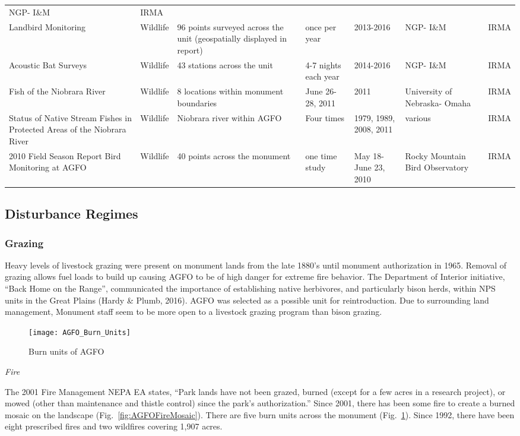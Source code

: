 \begin{longtable}[l]{@{}p{5cm}p{2cm}p{3cm}p{4cm}p{3cm}p{4cm}p{3cm}@{}}
NGP- I\&M & IRMA\tabularnewline
Landbird Monitoring & Wildlife & 96 points surveyed across the unit
(geospatially displayed in report) & once per year & 2013-2016 & NGP-
I\&M & IRMA\tabularnewline
Acoustic Bat Surveys & Wildlife & 43 stations across the unit & 4-7
nights each year & 2014-2016 & NGP- I\&M & IRMA\tabularnewline
Fish of the Niobrara River & Wildlife & 8 locations within monument
boundaries & June 26-28, 2011 & 2011 & University of Nebraska- Omaha &
IRMA\tabularnewline
Status of Native Stream Fishes in Protected Areas of the Niobrara River
& Wildlife & Niobrara river within AGFO & Four times & 1979, 1989, 2008,
2011 & various & IRMA\tabularnewline
2010 Field Season Report Bird Monitoring at AGFO & Wildlife & 40 points
across the monument & one time study & May 18- June 23, 2010 & Rocky
Mountain Bird Observatory & IRMA\tabularnewline
\bottomrule
\end{longtable}
\clearpage
\normalsetting
\pagestyle{fancy} 

\subsection{Disturbance Regimes }

\subsubsection{Grazing }

Heavy levels of livestock grazing were present on monument lands from the late 1880's until monument authorization in 1965. 
Removal of grazing allows fuel loads to build up causing AGFO to be of high danger for extreme fire behavior. 
The Department of Interior initiative, ``Back Home on the Range'', communicated the importance of establishing native herbivores, and particularly bison herds, within NPS units in the Great Plains (Hardy \& Plumb, 2016). 
AGFO was selected as a possible unit for reintroduction. 
Due to surrounding land management, Monument staff seem to be more open to a livestock grazing program than bison grazing.

\begin{figure}
	\centering
	\texttt{[image: AGFO\_Burn\_Units]}
	\caption{Burn units of AGFO}\label{fig:AGFOBurnUnits}
\end{figure}

\emph{Fire }

The 2001 Fire Management NEPA EA states, ``Park lands have not been grazed, burned (except for a few acres in a research project), or mowed (other than maintenance and thistle control) since the park's authorization.'' 
Since 2001, there has been some fire to create a burned
mosaic on the landscape (Fig.~\ref{fig:AGFOFireMosaic}). 
There are five burn units across the monument (Fig.~\ref{fig:AGFOBurnUnits}). 
Since 1992, there have been eight prescribed fires and two wildfires covering 1,907 acres.

